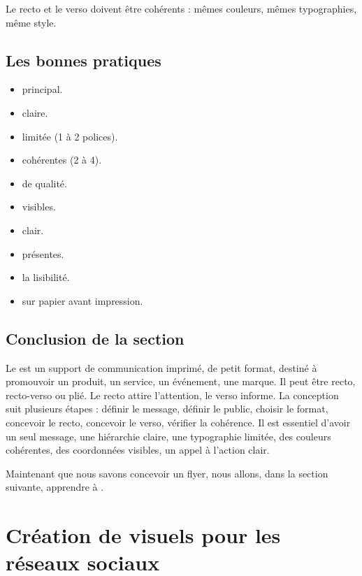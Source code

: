 Le recto et le verso doivent être cohérents : mêmes couleurs, mêmes typographies, même style.

\subsection{Les bonnes pratiques}

\begin{itemize}
    \item {} principal.
    \item {} claire.
    \item {} limitée (1 à 2 polices).
    \item {} cohérentes (2 à 4).
    \item {} de qualité.
    \item {} visibles.
    \item {} clair.
    \item {} présentes.
    \item {} la lisibilité.
    \item {} sur papier avant impression.
\end{itemize}

\subsection*{Conclusion de la section}

Le  est un support de communication imprimé, de petit format, destiné à promouvoir un produit, un service, un événement, une marque. Il peut être recto, recto-verso ou plié. Le recto attire l'attention, le verso informe. La conception suit plusieurs étapes : définir le message, définir le public, choisir le format, concevoir le recto, concevoir le verso, vérifier la cohérence. Il est essentiel d'avoir un seul message, une hiérarchie claire, une typographie limitée, des couleurs cohérentes, des coordonnées visibles, un appel à l'action clair.

Maintenant que nous savons concevoir un flyer, nous allons, dans la section suivante, apprendre à .

\section{Création de visuels pour les réseaux sociaux}

